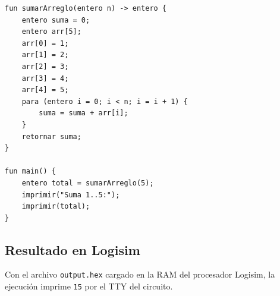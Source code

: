\begin{lstlisting}[style=tppstyle, caption={Prueba backend: sumar elementos de arreglo}]
fun sumarArreglo(entero n) -> entero {
    entero suma = 0;
    entero arr[5];
    arr[0] = 1;
    arr[1] = 2;
    arr[2] = 3;
    arr[3] = 4;
    arr[4] = 5;
    para (entero i = 0; i < n; i = i + 1) {
        suma = suma + arr[i];
    }
    retornar suma;
}

fun main() {
    entero total = sumarArreglo(5);
    imprimir("Suma 1..5:");
    imprimir(total);
}
\end{lstlisting}

\subsection{Resultado en Logisim}

Con el archivo \texttt{output.hex} cargado en la RAM del procesador Logisim, la ejecución imprime \texttt{15} por el TTY del circuito.

